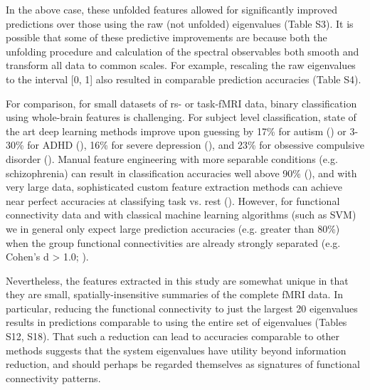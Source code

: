 In the above case, these unfolded features allowed for significantly improved predictions over those
using the raw (not unfolded) eigenvalues (Table S3). It is possible that some of these predictive
improvements are because both the unfolding procedure and calculation of the spectral observables
both smooth and transform all data to common scales. For example,  rescaling the raw eigenvalues to
the interval [0, 1] also resulted in comparable prediction accuracies (Table S4).

For comparison, for small datasets of rs- or task-fMRI data, binary classification using whole-brain
features is challenging. For subject level classification, state of the art deep learning methods
improve upon guessing by 17\% for autism (\cite{bengs4DSpatioTemporalDeep2020}) or 3-30\% for ADHD
(\cite{riazDeepFMRIEndtoendDeep2020}), 16\% for severe depression
(\cite{ramasubbuAccuracyAutomatedClassification2016}), and 23\% for obsessive compulsive disorder
(\cite{takagiNeuralMarkerObsessiveCompulsive2017}). Manual feature engineering with more separable
conditions (e.g. schizophrenia) can result in classification accuracies well above 90\%
(\cite{duHighClassificationAccuracy2012}), and with very large data, sophisticated custom feature
extraction methods can achieve near perfect accuracies at classifying task vs. rest
(\cite{zhangCharacterizingDifferentiatingTaskbased2016}). However, for functional connectivity data
and with classical machine learning algorithms (such as SVM) we in general only expect large
prediction accuracies (e.g. greater than 80\%) when the group functional connectivities are already
strongly separated (e.g. Cohen’s d > 1.0; \cite{dansereauStatisticalPowerPrediction2017}).

Nevertheless, the features extracted in this study are somewhat unique in that they are small,
spatially-insensitive summaries of the complete fMRI data. In particular, reducing the functional
connectivity to just the largest 20 eigenvalues results in predictions comparable to using the
entire set of eigenvalues (Tables S12, S18). That such a reduction can lead to accuracies comparable
to other methods suggests that the system eigenvalues have utility beyond information reduction, and
should perhaps be regarded themselves as signatures of functional connectivity patterns.

